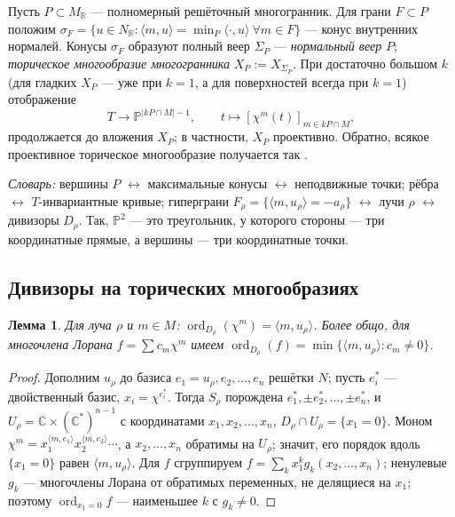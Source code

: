 \documentclass[11pt,a4paper]{article}
\theoremstyle{plain}
\newtheorem{lemma}[theorem]{Лемма}
\theoremstyle{definition}
\theoremstyle{remark}
\renewcommand{\C}{\mathbb{C}}
\newcommand{\R}{\mathbb{R}}
\newcommand{\PP}{\mathbb{P}}
\DeclareMathOperator{\ord}{ord}
\begin{document}
Пусть $P\subset M_\R$ --- полномерный решёточный многогранник. Для грани $F\subset P$ положим
$\sigma_F=\{u\in N_\R:\langle m,u\rangle=\min_{P}\langle\cdot,u\rangle\ \forall m\in F\}$ --- конус
внутренних нормалей. Конусы $\sigma_F$ образуют полный веер $\Sigma_P$ --- \emph{нормальный веер}
$P$; \emph{торическое многообразие многогранника} $X_P:=X_{\Sigma_P}$. При достаточно большом $k$
(для гладких $X_P$ --- уже при $k=1$, а для поверхностей всегда при $k=1$) отображение
\[
T\to\PP^{|kP\cap M|-1},\qquad t\mapsto[\chi^m(t)]_{m\in kP\cap M},
\]
продолжается до вложения $X_P$; в частности, $X_P$ проективно. Обратно, всякое проективное
торическое многообразие получается так \cite[2.3, 6.1]{CLS}.

\emph{Словарь:} вершины $P$ $\leftrightarrow$ максимальные конусы $\leftrightarrow$ неподвижные точки;
рёбра $\leftrightarrow$ $T$-инвариантные кривые; гиперграни $F_\rho=\{\langle m,u_\rho\rangle=-a_\rho\}$
$\leftrightarrow$ лучи $\rho$ $\leftrightarrow$ дивизоры $D_\rho$. Так, $\PP^2$ --- это треугольник, у
которого стороны --- три координатные прямые, а вершины --- три координатные точки.

\subsection{Дивизоры на торических многообразиях}

\begin{lemma}\label{lem:ord-toric}
Для луча $\rho$ и $m\in M$: $\ord_{D_\rho}(\chi^m)=\langle m,u_\rho\rangle$. Более общо, для многочлена
Лорана $f=\sum c_m\chi^m$ имеем $\ord_{D_\rho}(f)=\min\{\langle m,u_\rho\rangle: c_m\ne0\}$.
\end{lemma}
\begin{proof}
Дополним $u_\rho$ до базиса $e_1=u_\rho,e_2,\dots,e_n$ решётки $N$; пусть $e_i^*$ --- двойственный
базис, $x_i=\chi^{e_i^*}$. Тогда $S_\rho$ порождена $e_1^*,\pm e_2^*,\dots,\pm e_n^*$, и
$U_\rho=\C\times(\C^*)^{n-1}$ с координатами $x_1,x_2,\dots,x_n$, $D_\rho\cap U_\rho=\{x_1=0\}$.
Моном $\chi^m=x_1^{\langle m,e_1\rangle}x_2^{\langle m,e_2\rangle}\cdots$, а $x_2,\dots,x_n$ обратимы
на $U_\rho$; значит, его порядок вдоль $\{x_1=0\}$ равен $\langle m,u_\rho\rangle$. Для $f$ сгруппируем
$f=\sum_kx_1^kg_k(x_2,\dots,x_n)$; ненулевые $g_k$ --- многочлены Лорана от обратимых переменных,
не делящиеся на $x_1$; поэтому $\ord_{x_1=0}f$ --- наименьшее $k$ с $g_k\ne0$.
\end{proof}
\end{document}
